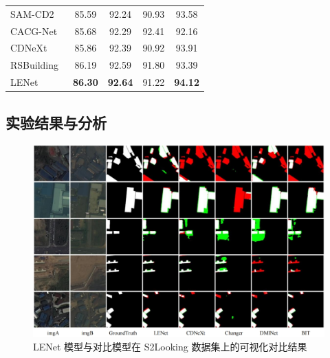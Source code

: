 \begin{table}[!htbp]
\begin{tabular}{lcccc}
    SAM-CD2~\cite{Sun2024SegmentAM}       &  85.59  &  92.24 &  90.93  &  93.58  \\
    CACG-Net~\cite{Liu2024CandidateAwareAC}      &  85.68  &  92.29 &  92.41  &  92.16  \\
    CDNeXt~\cite{wei_robust_2024}        &  85.86  &  92.39 &  90.92  &  93.91  \\
    RSBuilding~\cite{wang_rsbuilding_2024}    &  86.19  &  92.59 &  91.80  &  93.39  \\
    LENet                   & \textbf{86.30} & \textbf{92.64} &  91.22  & \textbf{94.12} \\
    \bottomrule
  \end{tabular}
\end{table}



\subsection{实验结果与分析}

\begin{figure}[!htbp]
  \centering
  \includegraphics[width=\textwidth]{paper_figures/基于双时相遥感影像特征交互的变化检测算法研究/LENet/lenet_s2looking.png}
  \caption{LENet 模型与对比模型在 S2Looking 数据集上的可视化对比结果}
  \label{fig:lenet_s2looking}
\end{figure}


